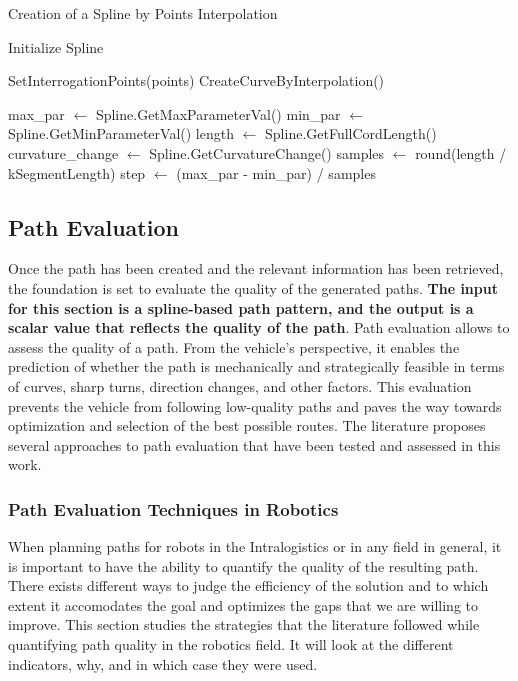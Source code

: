 \begin{algorithm}[H]
    \caption{Creation of a Spline by Points Interpolation}\label{alg:createSplines}

    \SetAlgoLined
    
    Initialize Spline\;
    
    SetInterrogationPoints(points)\;
    CreateCurveByInterpolation()\;
    
    max\_par $\gets$ Spline.GetMaxParameterVal()\;
    min\_par $\gets$ Spline.GetMinParameterVal()\;
    length $\gets$ Spline.GetFullCordLength()\;
    curvature\_change $\gets$ Spline.GetCurvatureChange()\;
    samples $\gets$ round(length / kSegmentLength)\;
    step $\gets$ (max\_par - min\_par) / samples\;
    
    
    \;
    
    \end{algorithm}




\subsection{Path Evaluation}
Once the path has been created and the relevant information has been retrieved, the foundation is set to evaluate the 
quality of the generated paths. \textbf{The input for this section is a spline-based path pattern, and the 
output is a scalar value that reflects the quality of the path}.
Path evaluation allows to assess the quality of a path. From the vehicle's perspective, it enables the 
prediction of whether the path is mechanically and strategically feasible in terms of curves, sharp turns, direction 
changes, and other factors. This evaluation prevents the vehicle from following low-quality paths and paves the way 
towards optimization and selection of the best possible routes.
The literature proposes several approaches to path evaluation 
that have been tested and assessed in this work.

\subsubsection{Path Evaluation Techniques in Robotics}
 
When planning paths for robots in the Intralogistics or in any field in general, it is important to have the ability 
to quantify the quality of the resulting path. There exists different ways to judge the efficiency of the solution
and to which extent it accomodates the goal and optimizes the gaps that we are willing to improve.
This section studies the strategies that the literature followed while quantifying path quality in the robotics
field. It will look at the different indicators, why, and in which case they were used. 

